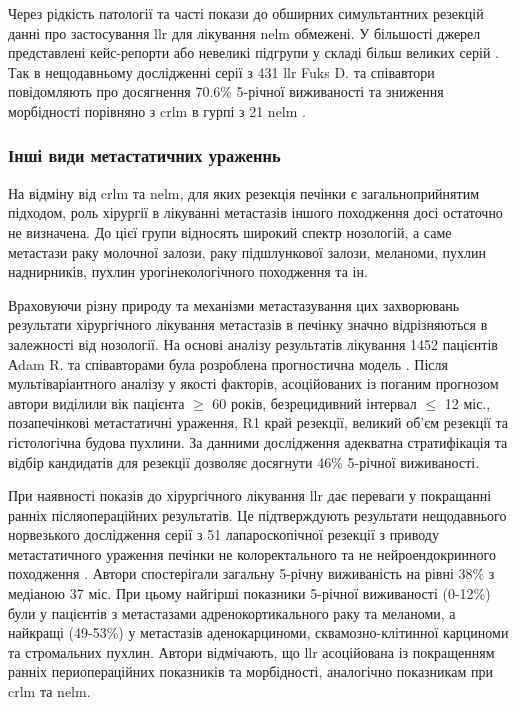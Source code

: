 \begin{refsection}
Через рідкість патології та часті покази до обширних симультантних резекцій данні про застосування \acrshort{llr} для лікування \acrshort{nelm} обмежені. У більшості джерел представлені кейс-репорти або невеликі підгрупи у складі більш великих серій \cite{Passuello2016}. Так в нещодавньому дослідженні серії з 431 \acrshort{llr} Fuks D. та співавтори повідомляють про досягнення 70.6\% 5-річної виживаності та зниження морбідності порівняно з  \acrshort{crlm}  в гурпі з 21 \acrshort{nelm} \cite{Triantafyllidis2019}.


\subsubsection{Інші види метастатичних ураженнь}

На відміну від \acrshort{crlm} та \acrshort{nelm}, для яких резекція печінки є загальноприйнятим підходом, роль хірургії в лікуванні метастазів іншого походження досі остаточно не визначена. До цієї групи відносять широкий спектр нозологій, а саме метастази раку молочної залози, раку підшлункової залози, меланоми, пухлин наднирників, пухлин урогінекологічного походження та ін. 

Враховуючи різну природу та механізми метастазування цих захворювань результати хірургічного лікування метастазів в печінку значно відрізняються в залежності від нозології. На основі аналізу результатів лікування 1452 пацієнтів Аdam R. та співавторами була розроблена прогностична модель \cite{Adam2006}. Після мультіваріантного аналізу у якості факторів, асоційованих із поганим прогнозом автори виділили вік пацієнта $\geq$ 60 років, безрецидивний інтервал $\leq$ 12 міс., позапечінкові метастатичні ураження, R1 край резекції, великий об'єм резекції та гістологічна будова пухлини. За данними дослідження адекватна стратифікація та відбір кандидатів для резекції дозволяє досягнути 46\% 5-річної виживаності.

При наявності показів до хірургічного лікування \acrshort{llr} дає переваги у покращанні ранніх післяопераційних результатів. Це підтверждують результати нещодавнього норвезького дослідження серії з 51 лапароскопічної резекції з приводу метастатичного ураження печінки не колоректального та не нейроендокринного походження \cite{Aghayan2019}. Автори спостерігали загальну 5-річну виживаність на рівні 38\% з медіаною 37 міс. При цьому найгірші показники 5-річної виживаності (0-12\%) були у пацієнтів з метастазами адренокортикального раку та меланоми, а найкращі (49-53\%) у метастазів аденокарциноми, сквамозно-клітинної карциноми та стромальних пухлин. Автори відмічають, що  \acrshort{llr} асоційована із покращенням ранніх периопераційних показників та морбідності, аналогічно показникам при \acrshort{crlm} та \acrshort{nelm}.


\end{refsection}
